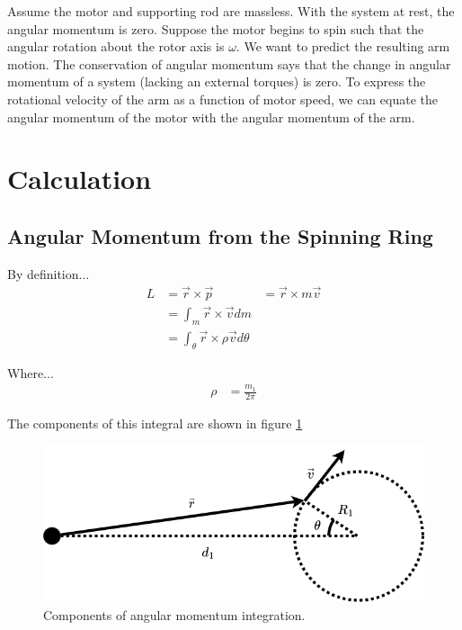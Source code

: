 \documentclass{article}
\begin{document}
	Assume the motor and supporting rod are massless.
	With the system at rest, the angular momentum is zero. 
	Suppose the motor begins to spin such that the angular rotation about the rotor axis is $\omega$.
	We want to predict the resulting arm motion.
	The conservation of angular momentum says that the change in angular momentum of a system (lacking an external torques)
	is zero. 
	To express the rotational velocity of the arm as a function of motor speed,
	we can equate the angular momentum of the motor with the angular momentum of the arm.


	\section{Calculation}
	\subsection{Angular Momentum from the Spinning Ring}

	By definition...
	\begin{align}
		L &= \vec{r} \times\vec{p}
	 	&= \vec{r} \times m \vec{v} \\
		&= \int_m\vec{r}\times\vec{v} dm \\
		&= \int_{\theta}\vec{r}\times\rho\vec{v} d\theta
	\end{align}

	Where...
	\begin{align}
		\rho &= \frac{m_1}{2\pi}
	\end{align}

	The components of this integral are shown in figure \ref{fig:one-arm-integral}

	\begin{figure}[h!]
		\includegraphics[width=\linewidth]{../diagrams/fern-v3-single-arm-integral-diagram.png}   
	 	\caption{Components of angular momentum integration.}
	 	\label{fig:one-arm-integral}
 	\end{figure}
\end{document}
